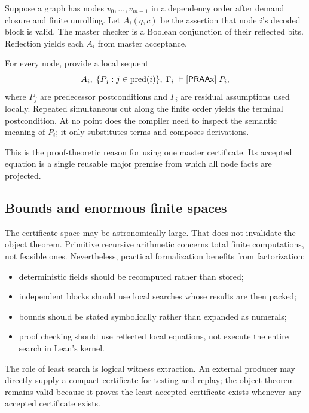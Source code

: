 Suppose a graph has nodes \(v_0,\ldots,v_{m-1}\) in a dependency order after demand closure and finite unrolling.  Let \(A_i(q,c)\) be the assertion that node \(i\)'s decoded block is valid.  The master checker is a Boolean conjunction of their reflected bits.  Reflection yields each \(A_i\) from master acceptance.

For every node, provide a local sequent
\begin{equation}
  A_i,\;\{P_j:j\in\operatorname{pred}(i)\},\;\Gamma_i
  \;\vdash[\mathsf{PRAAx}]\;P_i,
  \label{eq:local-node-sequent}
\end{equation}
where \(P_j\) are predecessor postconditions and \(\Gamma_i\) are residual assumptions used locally.  Repeated simultaneous cut along the finite order yields the terminal postcondition.  At no point does the compiler need to inspect the semantic meaning of \(P_i\); it only substitutes terms and composes derivations.

This is the proof-theoretic reason for using one master certificate.  Its accepted equation is a single reusable major premise from which all node facts are projected.

\subsection{Bounds and enormous finite spaces}

The certificate space may be astronomically large.  That does not invalidate the object theorem.  Primitive recursive arithmetic concerns total finite computations, not feasible ones.  Nevertheless, practical formalization benefits from factorization:

\begin{itemize}[leftmargin=2em]
\item deterministic fields should be recomputed rather than stored;
\item independent blocks should use local searches whose results are then packed;
\item bounds should be stated symbolically rather than expanded as numerals;
\item proof checking should use reflected local equations, not execute the entire search in Lean's kernel.
\end{itemize}

The role of least search is logical witness extraction.  An external producer may directly supply a compact certificate for testing and replay; the object theorem remains valid because it proves the least accepted certificate exists whenever any accepted certificate exists.
